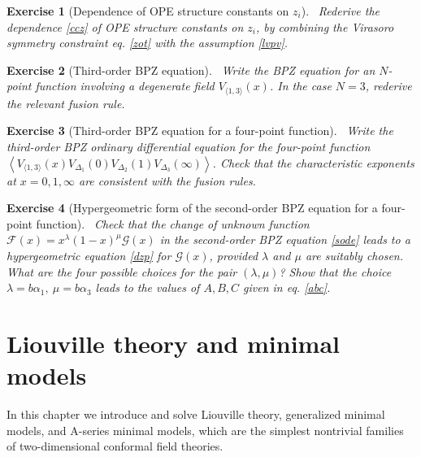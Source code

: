 \documentclass[12pt,a4paper,notitlepage]{report}
\numberwithin{equation}{section}
\theoremstyle{break}
\newtheorem{exo}{Exercise}[chapter]
\begin{document}
\begin{exo}[Dependence of OPE structure constants on $z_i$]
 ~\label{exoopz}
Rederive the dependence \eqref{ccz} of OPE structure constants on $z_i$, by combining the Virasoro symmetry constraint eq. \eqref{zot} with the assumption \eqref{lvpv}.  
\end{exo}

\begin{exo}[Third-order BPZ equation]
 ~\label{exotob}
 Write the BPZ equation for an $N$-point function involving a degenerate field $V_{\langle 1,3 \rangle}(x)$.
In the case $N=3$, rederive the relevant fusion rule.
\end{exo}

\begin{exo}[Third-order BPZ equation for a four-point function]
 ~\label{exotbf}
 Write the third-order BPZ ordinary differential equation for the four-point function $\left\langle V_{\langle 1,3 \rangle}(x)V_{\Delta_1}(0)V_{\Delta_2}(1)V_{\Delta_3}(\infty)\right\rangle $.
Check that the characteristic exponents at $x=0,1,\infty$ are consistent with the fusion rules. 
\end{exo}


\begin{exo}[Hypergeometric form of the second-order BPZ equation for a four-point function]
 ~\label{exohge}
 Check that the change of unknown function $\mathcal{F}(x)=x^{\lambda}(1-x)^{\mu}\mathcal{G}(x)$ in the second-order BPZ equation \eqref{sode} leads to a hypergeometric equation \eqref{dzp} for $\mathcal{G}(x)$, provided $\lambda$ and $\mu$ are suitably chosen.
What are the four possible choices for the pair $(\lambda,\mu)$?
Show that the choice $\lambda=b\alpha_1,\ \mu=b\alpha_3$ leads to the values of $A,B,C$ given in eq. \eqref{abc}. 
\end{exo}



\cleardoublepage

\chapter{Liouville theory and minimal models \label{seccbm}}

In this chapter we introduce and solve Liouville theory, generalized minimal models, and A-series minimal models, which are the simplest nontrivial families of two-dimensional conformal field theories. 
\end{document}
